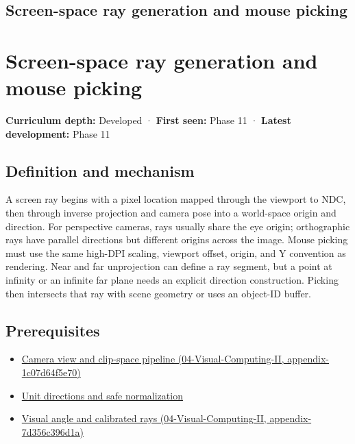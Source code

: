 \hypertarget{appendix-f1a6d43e80d1}{}
\section*{Screen-space ray generation and mouse picking}
\chapter{Screen-space ray generation and mouse picking}\label{appendix-f1a6d43e80d1-screen-space-ray-generation-and-mouse-picking}

\textbf{Curriculum depth:} Developed · \textbf{First seen:} Phase 11 · \textbf{Latest development:} Phase 11

\section{Definition and mechanism}\label{appendix-f1a6d43e80d1-definition-and-mechanism}

A screen ray begins with a pixel location mapped through the viewport to NDC, then through inverse projection and camera pose into a world-space origin and direction. For perspective cameras, rays usually share the eye origin; orthographic rays have parallel directions but different origins across the image. Mouse picking must use the same high-DPI scaling, viewport offset, origin, and Y convention as rendering. Near and far unprojection can define a ray segment, but a point at infinity or an infinite far plane needs an explicit direction construction. Picking then intersects that ray with scene geometry or uses an object-ID buffer.

\section{Prerequisites}\label{appendix-f1a6d43e80d1-prerequisites}

\begin{itemize}
\tightlist
\item
  \href{../04-Visual-Computing-II/main.pdf\#nameddest=appendix-1c07d64f5e70}{Camera view and clip-space pipeline (04-Visual-Computing-II, appendix-1c07d64f5e70)}
\item
  \hyperref[appendix-f744e41b95b4]{Unit directions and safe normalization}
\item
  \href{../04-Visual-Computing-II/main.pdf\#nameddest=appendix-7d356c396d1a}{Visual angle and calibrated rays (04-Visual-Computing-II, appendix-7d356c396d1a)}
\end{itemize}

